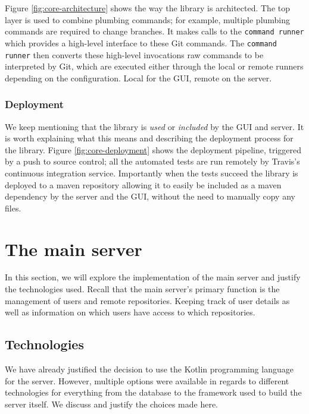 Figure \ref{fig:core-architecture} shows the way the library is architected. The top layer is used to combine plumbing commands; for example, multiple plumbing commands are required to change branches. It makes calls to the \texttt{command runner} which provides a high-level interface to these Git commands. The  \texttt{command runner} then converts these high-level invocations raw commands to be interpreted by Git, which are executed either through the local or remote runners depending on the configuration. Local for the GUI, remote on the server.



\subsubsection{Deployment}

We keep mentioning that the library is \emph{used} or \emph{included} by the GUI and server. It is worth explaining what this means and describing the deployment process for the library. Figure \ref{fig:core-deployment} shows the deployment pipeline, triggered by a push to source control; all the automated tests are run remotely by Travis's continuous integration service. Importantly when the tests succeed the library is deployed to a maven repository allowing it to easily be included as a maven dependency by the server and the GUI, without the need to manually copy any files.


\section{The main server}
In this section, we will explore the implementation of the main server and justify the technologies used. Recall that the main server's primary function is the management of users and remote repositories. Keeping track of user details as well as information on which users have access to which repositories. 

\subsection{Technologies}\label{sec:technologies}

We have already justified the decision to use the Kotlin programming language for the server. However, multiple options were available in regards to different technologies for everything from the database to the framework used to build the server itself. We discuss and justify the choices made here.

